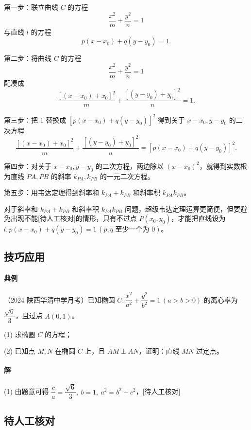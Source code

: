 \documentclass[UTF8,a4paper,11pt]{ctexart}
\begin{document}
第一步：联立曲线 $C$ 的方程
\[
\frac{x^2}{m}+\frac{y^2}{n}=1
\]
与直线 $l$ 的方程
\[
p(x-x_0)+q(y-y_0)=1.
\]

第二步：将曲线 $C$ 的方程
\[
\frac{x^2}{m}+\frac{y^2}{n}=1
\]
配凑成
\[
\frac{[(x-x_0)+x_0]^2}{m}+\frac{[(y-y_0)+y_0]^2}{n}=1.
\]

第三步：把 $1$ 替换成 $[p(x-x_0)+q(y-y_0)]^2$ 得到关于 $x-x_0,y-y_0$ 的二次方程
\[
\frac{[(x-x_0)+x_0]^2}{m}+\frac{[(y-y_0)+y_0]^2}{n}=[p(x-x_0)+q(y-y_0)]^2.
\]

第四步：对关于 $x-x_0,y-y_0$ 的二次方程，两边除以 $(x-x_0)^2$，就得到实数根为直线 $PA,PB$ 的斜率 $k_{PA},k_{PB}$ 的一元二次方程。

第五步：用韦达定理得到斜率和 $k_{PA}+k_{PB}$ 和斜率积 $k_{PA}k_{PB}$。

对于斜率和 $k_{PA}+k_{PB}$ 和斜率积 $k_{PA}k_{PB}$ 问题，超级韦达定理运算更简便，但要避免出现不能[待人工核对]的情形，只有不过点 $P(x_0,y_0)$，才能把直线设为 $l:p(x-x_0)+q(y-y_0)=1\,(p,q\text{ 至少一个为 }0)$。

\subsection{技巧应用}
\paragraph{典例}（2024 陕西华清中学月考）已知椭圆 $C:\dfrac{x^2}{a^2}+\dfrac{y^2}{b^2}=1\,(a>b>0)$ 的离心率为 $\dfrac{\sqrt{6}}{3}$，且过点 $A(0,1)$。

(1) 求椭圆 $C$ 的方程；

(2) 已知点 $M,N$ 在椭圆 $C$ 上，且 $AM\perp AN$，证明：直线 $MN$ 过定点。

\paragraph{解} (1) 由题意可得 $\dfrac{c}{a}=\dfrac{\sqrt{6}}{3},\ b=1,\ a^2=b^2+c^2$，[待人工核对]

\subsection*{待人工核对}
\end{document}
